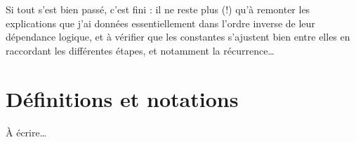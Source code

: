 \medskip

Si tout s'est bien passé, c'est fini : il ne reste plus (!) qu'à remonter les
explications que j'ai données essentiellement dans l'ordre inverse de leur
dépendance logique, et à vérifier que les constantes s'ajustent bien entre
elles en raccordant les différentes étapes, et notamment la récurrence\dots

\section{Définitions et notations}

À écrire\dots

\endinput


